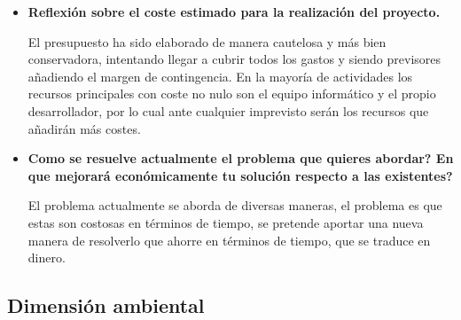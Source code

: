 \begin{itemize}
 \item \textbf{Reflexión sobre el coste estimado para la realización del proyecto.}\newline
 
    El presupuesto ha sido elaborado de manera cautelosa y más bien conservadora, intentando llegar a cubrir todos los gastos y siendo previsores añadiendo el margen de contingencia. En la mayoría de actividades los recursos principales con coste no nulo son el equipo informático y el propio desarrollador, por lo cual ante cualquier imprevisto serán los recursos que añadirán más costes.

 \item \textbf{Como se resuelve actualmente el problema que quieres abordar? En que mejorará económicamente tu solución respecto a las existentes?}\newline
 
 El problema actualmente se aborda de diversas maneras, el problema es que estas son costosas en términos de tiempo, se pretende aportar una nueva manera de resolverlo que ahorre en términos de tiempo, que se traduce en dinero.
\end{itemize}

\subsection{Dimensión ambiental}

